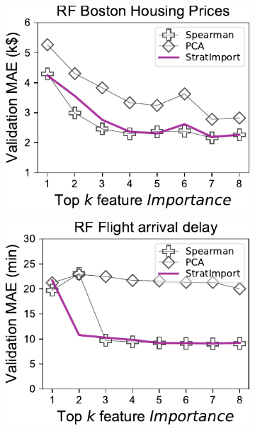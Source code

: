 \documentclass[11pt]{article}
\begin{document}
\begin{figure}
\centering
\begin{subfigure}{.245\textwidth}
    \centering
\includegraphics[scale=0.45]{images/boston-topk-RF-baseline.pdf}
\vspace{-7mm}
\subcaption{}
\end{subfigure}%
\begin{subfigure}{.245\textwidth}
    \centering
\includegraphics[scale=0.45]{images/flights-topk-RF-baseline.pdf}
\vspace{-7mm}
\subcaption{}
\end{subfigure}

\end{figure}
\end{document}
